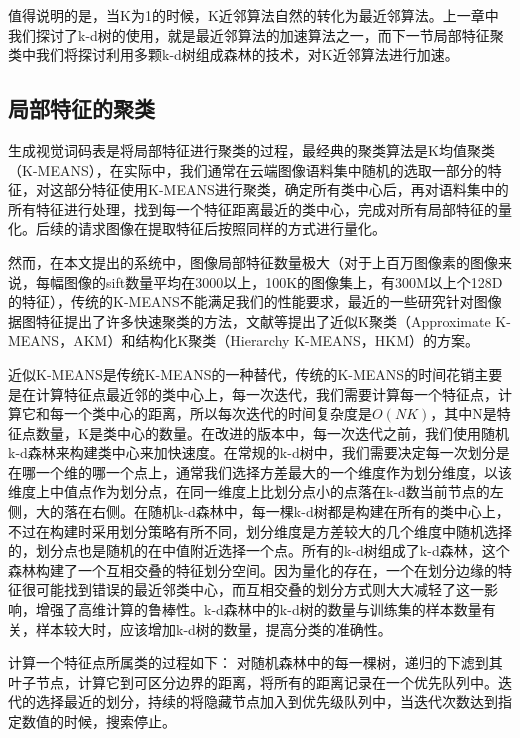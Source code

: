 值得说明的是，当K为1的时候，K近邻算法自然的转化为最近邻算法。上一章中我们探讨了k-d树的使用，就是最近邻算法的加速算法之一，而下一节局部特征聚类中我们将探讨利用多颗k-d树组成森林的技术，对K近邻算法进行加速。


\subsection{局部特征的聚类}
生成视觉词码表是将局部特征进行聚类的过程，最经典的聚类算法是K均值聚类（K-MEANS），在实际中，我们通常在云端图像语料集中随机的选取一部分的特征，对这部分特征使用K-MEANS进行聚类，确定所有类中心后，再对语料集中的所有特征进行处理，找到每一个特征距离最近的类中心，完成对所有局部特征的量化。后续的请求图像在提取特征后按照同样的方式进行量化。

然而，在本文提出的系统中，图像局部特征数量极大（对于上百万图像素的图像来说，每幅图像的sift数量平均在3000以上，100K的图像集上，有300M以上个128D的特征），传统的K-MEANS不能满足我们的性能要求，最近的一些研究针对图像据图特征提出了许多快速聚类的方法，文献\cite{Philbin:2007fk,Muja:2009uv,Wang:2010vs}等提出了近似K聚类（Approximate K-MEANS，AKM）和结构化K聚类（Hierarchy K-MEANS，HKM）的方案。

近似K-MEANS是传统K-MEANS的一种替代，传统的K-MEANS的时间花销主要是在计算特征点最近邻的类中心上，每一次迭代，我们需要计算每一个特征点，计算它和每一个类中心的距离，所以每次迭代的时间复杂度是\(O(NK)\)，其中N是特征点数量，K是类中心的数量。在改进的版本中，每一次迭代之前，我们使用随机k-d森林来构建类中心来加快速度。在常规的k-d树中，我们需要决定每一次划分是在哪一个维的哪一个点上，通常我们选择方差最大的一个维度作为划分维度，以该维度上中值点作为划分点，在同一维度上比划分点小的点落在k-d数当前节点的左侧，大的落在右侧。在随机k-d森林中，每一棵k-d树都是构建在所有的类中心上，不过在构建时采用划分策略有所不同，划分维度是方差较大的几个维度中随机选择的，划分点也是随机的在中值附近选择一个点。所有的k-d树组成了k-d森林，这个森林构建了一个互相交叠的特征划分空间。因为量化的存在，一个在划分边缘的特征很可能找到错误的最近邻类中心，而互相交叠的划分方式则大大减轻了这一影响，增强了高维计算的鲁棒性。k-d森林中的k-d树的数量与训练集的样本数量有关，样本较大时，应该增加k-d树的数量，提高分类的准确性。

计算一个特征点所属类的过程如下：
对随机森林中的每一棵树，递归的下滤到其叶子节点，计算它到可区分边界的距离，将所有的距离记录在一个优先队列中。迭代的选择最近的划分，持续的将隐藏节点加入到优先级队列中，当迭代次数达到指定数值的时候，搜索停止。

